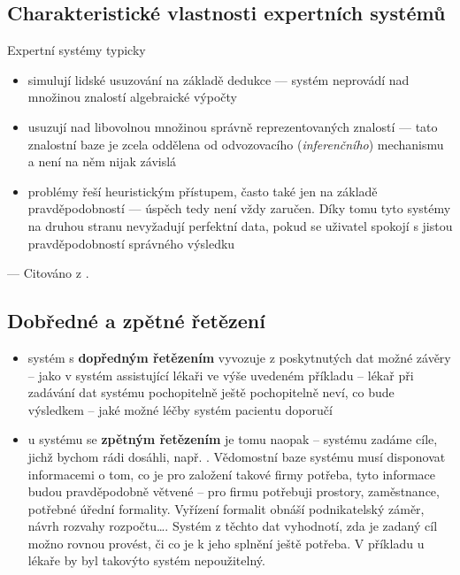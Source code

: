 \subsection{Charakteristické vlastnosti expertních systémů}
Expertní systémy typicky
\begin{itemize}
\item simulují lidské usuzování na základě dedukce
  --- systém neprovádí nad množinou znalostí algebraické výpočty
\item usuzují nad libovolnou množinou správně reprezentovaných znalostí
  --- tato znalostní baze je zcela oddělena od odvozovacího (\emph
  {inferenčního}) mechanismu a není na něm nijak závislá
\item problémy řeší heuristickým přístupem, často také jen na
  základě pravděpodobností --- úspěch tedy není vždy zaručen. Díky tomu tyto
  systémy na druhou stranu nevyžadují perfektní data, pokud se uživatel
  spokojí s jistou pravděpodobností správného výsledku
\end{itemize}
--- Citováno z \cite{introduction}.
\subsection{Dobředné a zpětné řetězení}
\begin{itemize}
\item systém s \textbf{dopředným řetězením} vyvozuje z poskytnutých dat možné
závěry -- jako v systém assistující lékaři ve výše uvedeném příkladu --
lékař při zadávání dat systému pochopitelně ještě pochopitelně neví, co bude
výsledkem -- jaké možné léčby systém pacientu doporučí
\item u systému se \textbf{zpětným řetězením} je tomu naopak -- systému
zadáme cíle, jichž bychom rádi dosáhli, např. . Vědomostní baze systému musí disponovat informacemi o tom, co je
pro založení takové firmy potřeba, tyto informace budou pravděpodobně větvené
-- pro firmu potřebuji prostory, zaměstnance, potřebné úřední formality.
Vyřízení formalit obnáší podnikatelský záměr, návrh rozvahy rozpočtu\ldots.
Systém z těchto dat vyhodnotí, zda je zadaný cíl možno rovnou provést, či
co je k jeho splnění ještě potřeba. V příkladu u lékaře by byl takovýto
systém nepoužitelný.
\end{itemize}
